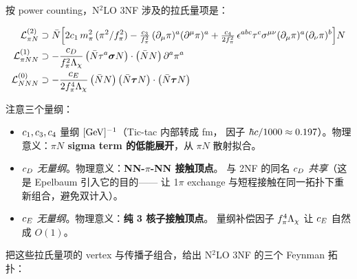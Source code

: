 按 power counting，N\(^2\)LO 3NF 涉及的拉氏量项是：

\begin{align}
\label{eq:ch15-LpiN-c-terms}
\mathcal{L}^{(2)}_{\pi N}
&\supset
\bar{N} \Big[ 2 c_1 \, m_\pi^2 \,(\pi^2/f_\pi^2)
       - \tfrac{c_3}{f_\pi^2}\, (\partial_\mu \pi)^a (\partial^\mu \pi)^a
       + \tfrac{c_4}{2f_\pi^2}\, \epsilon^{abc} \tau^c
            \sigma^{\mu\nu} (\partial_\mu \pi)^a (\partial_\nu \pi)^b
       \Big] N \\
\label{eq:ch15-LpiNN-cD}
\mathcal{L}^{(1)}_{\pi NN}
&\supset
- \frac{c_D}{f_\pi^2 \Lambda_\chi}\,
   \big( \bar{N} \tau^a \bm{\sigma} N \big)
   \cdot \big( \bar{N} N \big)\,
   \partial^a \pi^a \\
\label{eq:ch15-LNNN-cE}
\mathcal{L}^{(0)}_{NNN}
&\supset
- \frac{c_E}{2 f_\pi^4 \Lambda_\chi}\,
   \big( \bar{N} N \big)\, \big( \bar{N} \bm{\tau} N \big)
   \cdot \big( \bar{N} \bm{\tau} N \big)
\end{align}

注意三个量纲：
\begin{itemize}
\item \(c_1, c_3, c_4\) 量纲 \([\rm GeV]^{-1}\)（Tic-tac 内部转成 fm，
      因子 \(\hbar c/1000 \approx 0.197\)）。物理意义：\textbf{\(\pi N\) sigma
      term 的低能展开}，从 \(\pi N\) 散射拟合。
\item \(c_D\) \emph{无量纲}。物理意义：\textbf{NN-\(\pi\)-NN 接触顶点}。
      与 2NF 的同名 \(c_D\) \emph{共享}（这是 Epelbaum 引入它的目的——
      让 1\(\pi\) exchange 与短程接触在同一拓扑下重新组合，避免双计入）。
\item \(c_E\) \emph{无量纲}。物理意义：\textbf{纯 3 核子接触顶点}。
      量纲补偿因子 \(f_\pi^4 \Lambda_\chi\) 让 \(c_E\) 自然成 \(O(1)\)。
\end{itemize}

把这些拉氏量项的 vertex 与传播子组合，给出 N\(^2\)LO 3NF 的三个 Feynman 拓扑：

